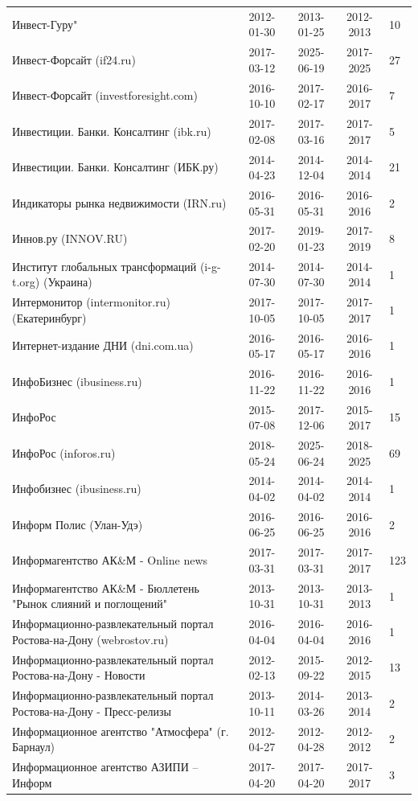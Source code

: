 \begin{longtable}{p{6cm}cccp{2cm}}
Инвест-Гуру" & 2012-01-30 & 2013-01-25 & 2012-2013 & 10\\
Инвест-Форсайт (if24.ru) & 2017-03-12 & 2025-06-19 & 2017-2025 & 27\\
Инвест-Форсайт (investforesight.com) & 2016-10-10 & 2017-02-17 & 2016-2017 & 7\\
Инвестиции. Банки. Консалтинг (ibk.ru) & 2017-02-08 & 2017-03-16 & 2017-2017 & 5\\
Инвестиции. Банки. Консалтинг (ИБК.ру) & 2014-04-23 & 2014-12-04 & 2014-2014 & 21\\
Индикаторы рынка недвижимости (IRN.ru) & 2016-05-31 & 2016-05-31 & 2016-2016 & 2\\
Иннов.ру (INNOV.RU) & 2017-02-20 & 2019-01-23 & 2017-2019 & 8\\
Институт глобальных трансформаций (i-g-t.org) (Украина) & 2014-07-30 & 2014-07-30 & 2014-2014 & 1\\
Интермонитор (intermonitor.ru) (Екатеринбург) & 2017-10-05 & 2017-10-05 & 2017-2017 & 1\\
Интернет-издание ДНИ (dni.com.ua) & 2016-05-17 & 2016-05-17 & 2016-2016 & 1\\
ИнфоБизнес (ibusiness.ru) & 2016-11-22 & 2016-11-22 & 2016-2016 & 1\\
ИнфоРос & 2015-07-08 & 2017-12-06 & 2015-2017 & 15\\
ИнфоРос (inforos.ru) & 2018-05-24 & 2025-06-24 & 2018-2025 & 69\\
Инфобизнес (ibusiness.ru) & 2014-04-02 & 2014-04-02 & 2014-2014 & 1\\
Информ Полис (Улан-Удэ) & 2016-06-25 & 2016-06-25 & 2016-2016 & 2\\
Информагентство АК\&М - Online news & 2017-03-31 & 2017-03-31 & 2017-2017 & 123\\
Информагентство АК\&М - Бюллетень "Рынок слияний и поглощений" & 2013-10-31 & 2013-10-31 & 2013-2013 & 1\\
Информационно-развлекательный портал Ростова-на-Дону (webrostov.ru) & 2016-04-04 & 2016-04-04 & 2016-2016 & 1\\
Информационно-развлекательный портал Ростова-на-Дону - Новости & 2012-02-13 & 2015-09-22 & 2012-2015 & 13\\
Информационно-развлекательный портал Ростова-на-Дону - Пресс-релизы & 2013-10-11 & 2014-03-26 & 2013-2014 & 2\\
Информационное агентство "Атмосфера" (г. Барнаул) & 2012-04-27 & 2012-04-28 & 2012-2012 & 2\\
Информационное агентство АЗИПИ – Информ & 2017-04-20 & 2017-04-20 & 2017-2017 & 3\\

\end{longtable}
